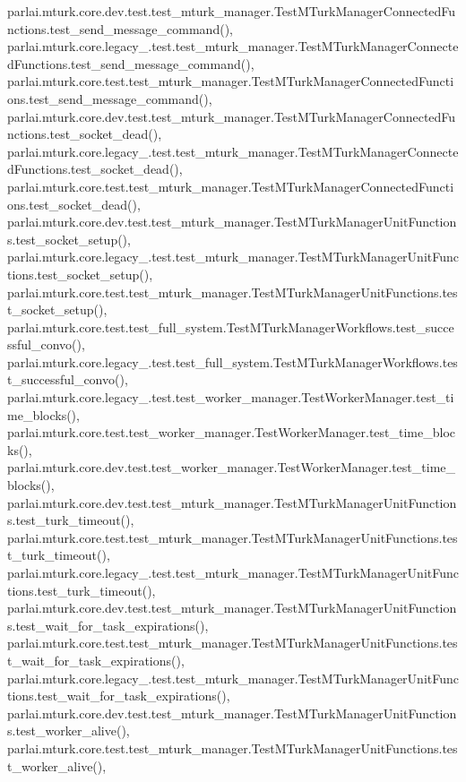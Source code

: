 parlai.\+mturk.\+core.\+dev.\+test.\+test\+\_\+mturk\+\_\+manager.\+Test\+M\+Turk\+Manager\+Connected\+Functions.\+test\+\_\+send\+\_\+message\+\_\+command(), parlai.\+mturk.\+core.\+legacy\+\_.\+test.\+test\+\_\+mturk\+\_\+manager.\+Test\+M\+Turk\+Manager\+Connected\+Functions.\+test\+\_\+send\+\_\+message\+\_\+command(), parlai.\+mturk.\+core.\+test.\+test\+\_\+mturk\+\_\+manager.\+Test\+M\+Turk\+Manager\+Connected\+Functions.\+test\+\_\+send\+\_\+message\+\_\+command(), parlai.\+mturk.\+core.\+dev.\+test.\+test\+\_\+mturk\+\_\+manager.\+Test\+M\+Turk\+Manager\+Connected\+Functions.\+test\+\_\+socket\+\_\+dead(), parlai.\+mturk.\+core.\+legacy\+\_.\+test.\+test\+\_\+mturk\+\_\+manager.\+Test\+M\+Turk\+Manager\+Connected\+Functions.\+test\+\_\+socket\+\_\+dead(), parlai.\+mturk.\+core.\+test.\+test\+\_\+mturk\+\_\+manager.\+Test\+M\+Turk\+Manager\+Connected\+Functions.\+test\+\_\+socket\+\_\+dead(), parlai.\+mturk.\+core.\+dev.\+test.\+test\+\_\+mturk\+\_\+manager.\+Test\+M\+Turk\+Manager\+Unit\+Functions.\+test\+\_\+socket\+\_\+setup(), parlai.\+mturk.\+core.\+legacy\+\_.\+test.\+test\+\_\+mturk\+\_\+manager.\+Test\+M\+Turk\+Manager\+Unit\+Functions.\+test\+\_\+socket\+\_\+setup(), parlai.\+mturk.\+core.\+test.\+test\+\_\+mturk\+\_\+manager.\+Test\+M\+Turk\+Manager\+Unit\+Functions.\+test\+\_\+socket\+\_\+setup(), parlai.\+mturk.\+core.\+test.\+test\+\_\+full\+\_\+system.\+Test\+M\+Turk\+Manager\+Workflows.\+test\+\_\+successful\+\_\+convo(), parlai.\+mturk.\+core.\+legacy\+\_.\+test.\+test\+\_\+full\+\_\+system.\+Test\+M\+Turk\+Manager\+Workflows.\+test\+\_\+successful\+\_\+convo(), parlai.\+mturk.\+core.\+legacy\+\_.\+test.\+test\+\_\+worker\+\_\+manager.\+Test\+Worker\+Manager.\+test\+\_\+time\+\_\+blocks(), parlai.\+mturk.\+core.\+test.\+test\+\_\+worker\+\_\+manager.\+Test\+Worker\+Manager.\+test\+\_\+time\+\_\+blocks(), parlai.\+mturk.\+core.\+dev.\+test.\+test\+\_\+worker\+\_\+manager.\+Test\+Worker\+Manager.\+test\+\_\+time\+\_\+blocks(), parlai.\+mturk.\+core.\+dev.\+test.\+test\+\_\+mturk\+\_\+manager.\+Test\+M\+Turk\+Manager\+Unit\+Functions.\+test\+\_\+turk\+\_\+timeout(), parlai.\+mturk.\+core.\+test.\+test\+\_\+mturk\+\_\+manager.\+Test\+M\+Turk\+Manager\+Unit\+Functions.\+test\+\_\+turk\+\_\+timeout(), parlai.\+mturk.\+core.\+legacy\+\_.\+test.\+test\+\_\+mturk\+\_\+manager.\+Test\+M\+Turk\+Manager\+Unit\+Functions.\+test\+\_\+turk\+\_\+timeout(), parlai.\+mturk.\+core.\+dev.\+test.\+test\+\_\+mturk\+\_\+manager.\+Test\+M\+Turk\+Manager\+Unit\+Functions.\+test\+\_\+wait\+\_\+for\+\_\+task\+\_\+expirations(), parlai.\+mturk.\+core.\+test.\+test\+\_\+mturk\+\_\+manager.\+Test\+M\+Turk\+Manager\+Unit\+Functions.\+test\+\_\+wait\+\_\+for\+\_\+task\+\_\+expirations(), parlai.\+mturk.\+core.\+legacy\+\_.\+test.\+test\+\_\+mturk\+\_\+manager.\+Test\+M\+Turk\+Manager\+Unit\+Functions.\+test\+\_\+wait\+\_\+for\+\_\+task\+\_\+expirations(), parlai.\+mturk.\+core.\+dev.\+test.\+test\+\_\+mturk\+\_\+manager.\+Test\+M\+Turk\+Manager\+Unit\+Functions.\+test\+\_\+worker\+\_\+alive(), parlai.\+mturk.\+core.\+test.\+test\+\_\+mturk\+\_\+manager.\+Test\+M\+Turk\+Manager\+Unit\+Functions.\+test\+\_\+worker\+\_\+alive(), 